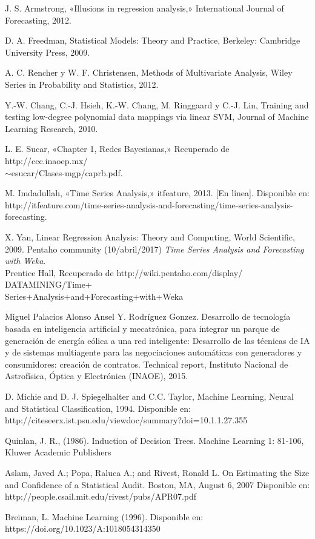 \begin{thebibliography}{a}
	 J. S. Armstrong, «Illusions in regression analysis,» International Journal of Forecasting, 2012.

	 D. A. Freedman, Statistical Models: Theory and Practice, Berkeley: Cambridge University Press, 2009.
		
	 A. C. Rencher y W. F. Christensen, Methods of Multivariate Analysis, Wiley Series in Probability and Statistics, 2012.

	 Y.-W. Chang, C.-J. Hsieh, K.-W. Chang, M. Ringgaard y C.-J. Lin, Training and testing low-degree
polynomial data mappings via linear SVM, Journal of Machine Learning Research, 2010.
	
	 L. E. Sucar, «Chapter 1, Redes Bayesianas,» Recuperado de
	http://ccc.inaoep.mx/\\$\sim$esucar/Clases-mgp/caprb.pdf. %

	 M. Imdadullah, «Time Series Analysis,» itfeature, 2013. [En línea]. Disponible en:
http://itfeature.com/time-series-analysis-and-forecasting/time-series-analysis-forecasting.

	 X. Yan, Linear Regression Analysis: Theory and Computing, World Scientific,
2009.
	  Pentaho community (10/abril/2017) {\it Time Series Analysis and
	Forecasting with Weka}.\\ Prentice Hall, Recuperado de http://wiki.pentaho.com/display/
	DATAMINING/Time+\\Series+Analysis+and+Forecasting+with+Weka
	
		 Miguel Palacios Alonso Ansel Y. Rodríguez Gonzez. Desarrollo de tecnología basada en inteligencia artificial y mecatrónica, para integrar un parque de generación de energía eólica a una red inteligente: 
	Desarrollo de las técnicas de IA y de sistemas multiagente para las negociaciones automáticas con generadores y consumidores: creación de contratos.
	Technical report, Instituto Nacional de Astrofísica, Óptica y Electrónica (INAOE), 2015.
	
	 D. Michie and D. J. Spiegelhalter and C.C. Taylor, 
	Machine Learning, Neural and Statistical Classification, 1994. Disponible en: 
	http://citeseerx.ist.psu.edu/viewdoc/summary?doi=10.1.1.27.355

	 Quinlan, J. R., (1986). Induction of Decision Trees. Machine Learning 1: 81-106, Kluwer Academic Publishers
	
	 Aslam, Javed A.; Popa, Raluca A.; and Rivest, Ronald L. On Estimating the Size and Confidence of a Statistical Audit. Boston, MA, August 6, 2007 Disponible en: http://people.csail.mit.edu/rivest/pubs/APR07.pdf
	
		Breiman, L. Machine Learning (1996). Disponible en: https://doi.org/10.1023/A:1018054314350
	
\end{thebibliography}
